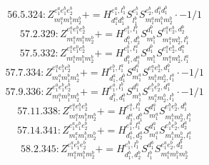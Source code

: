 \documentclass[letterpaper,10pt,fleqn,leqno,onecolumn]{article}
\begin{document}
\begin{equation} \;\;\;\;\;\;  56.5.324: Z^{e_{1}^{a}e_{1}^{b}e_{2}^{b}}_{m_{1}^{a}m_{1}^{b}m_{2}^{b}}+=H^{e_{1}^{a},l_{1}^{b}}_{d_{1}^{a}d_{1}^{b}}S^{e_{1}^{b}}_{l_{1}^{b}}S^{e_{2}^{b},d_{1}^{a}d_{1}^{b}}_{m_{1}^{a}m_{1}^{b}m_{2}^{b}}\cdot -1/1 \end{equation}
\begin{equation} \;\;\;\;\;\;  57.2.329: Z^{e_{1}^{a}e_{1}^{b}e_{2}^{b}}_{m_{1}^{a}m_{1}^{b}m_{2}^{b}}+=H^{e_{1}^{b},l_{1}^{b}}_{d_{1}^{b},d_{2}^{b}}S^{d_{1}^{b}}_{m_{1}^{b}}S^{e_{1}^{a}e_{2}^{b},d_{2}^{b}}_{m_{1}^{a}m_{2}^{b},l_{1}^{b}} \end{equation}
\begin{equation} \;\;\;\;\;\;  57.5.332: Z^{e_{1}^{a}e_{1}^{b}e_{2}^{b}}_{m_{1}^{a}m_{1}^{b}m_{2}^{b}}+=H^{e_{1}^{b},l_{1}^{a}}_{d_{1}^{b},d_{1}^{a}}S^{d_{1}^{b}}_{m_{1}^{b}}S^{e_{1}^{a}e_{2}^{b},d_{1}^{a}}_{m_{1}^{a}m_{2}^{b},l_{1}^{a}} \end{equation}
\begin{equation} \;\;\;\;\;\;  57.7.334: Z^{e_{1}^{a}e_{1}^{b}e_{2}^{b}}_{m_{1}^{a}m_{1}^{b}m_{2}^{b}}+=H^{e_{1}^{b},l_{1}^{a}}_{d_{1}^{a},d_{1}^{b}}S^{d_{1}^{a}}_{m_{1}^{a}}S^{e_{1}^{a}e_{2}^{b},d_{1}^{b}}_{m_{1}^{b}m_{2}^{b},l_{1}^{a}}\cdot -1/1 \end{equation}
\begin{equation} \;\;\;\;\;\;  57.9.336: Z^{e_{1}^{a}e_{1}^{b}e_{2}^{b}}_{m_{1}^{a}m_{1}^{b}m_{2}^{b}}+=H^{e_{1}^{a},l_{1}^{b}}_{d_{1}^{b},d_{1}^{a}}S^{d_{1}^{b}}_{m_{1}^{b}}S^{e_{1}^{b}e_{2}^{b},d_{1}^{a}}_{m_{1}^{a}m_{2}^{b},l_{1}^{b}}\cdot -1/1 \end{equation}
\begin{equation} \;\;\;\;\;\;  57.11.338: Z^{e_{1}^{a}e_{1}^{b}e_{2}^{b}}_{m_{1}^{a}m_{1}^{b}m_{2}^{b}}+=H^{e_{1}^{a},l_{1}^{b}}_{d_{1}^{a},d_{1}^{b}}S^{d_{1}^{a}}_{m_{1}^{a}}S^{e_{1}^{b}e_{2}^{b},d_{1}^{b}}_{m_{1}^{b}m_{2}^{b},l_{1}^{b}} \end{equation}
\begin{equation} \;\;\;\;\;\;  57.14.341: Z^{e_{1}^{a}e_{1}^{b}e_{2}^{b}}_{m_{1}^{a}m_{1}^{b}m_{2}^{b}}+=H^{e_{1}^{a},l_{1}^{a}}_{d_{1}^{a},d_{2}^{a}}S^{d_{1}^{a}}_{m_{1}^{a}}S^{e_{1}^{b}e_{2}^{b},d_{2}^{a}}_{m_{1}^{b}m_{2}^{b},l_{1}^{a}} \end{equation}
\begin{equation} \;\;\;\;\;\;  58.2.345: Z^{e_{1}^{a}e_{1}^{b}e_{2}^{b}}_{m_{1}^{a}m_{1}^{b}m_{2}^{b}}+=H^{e_{1}^{b},l_{1}^{b}}_{d_{1}^{b},d_{2}^{b}}S^{d_{1}^{b}}_{l_{1}^{b}}S^{e_{1}^{a}e_{2}^{b},d_{2}^{b}}_{m_{1}^{a}m_{1}^{b}m_{2}^{b}} \end{equation}
\end{document}
